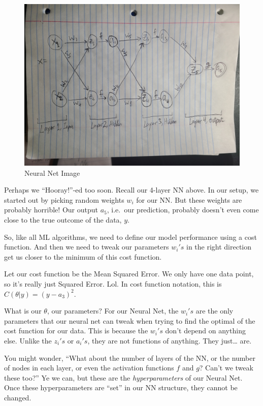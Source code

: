 \documentclass[
]{article}
\begin{document}
\begin{figure}
\centering
\includegraphics{nn_image.jpg}
\caption{Neural Net Image}
\end{figure}

Perhaps we ``Hooray!''-ed too soon. Recall our 4-layer NN above. In our
setup, we started out by picking random weights \(w_i\) for our NN. But
these weights are probably horrible! Our output \(a_5\), i.e.~our
prediction, probably doesn't even come close to the true outcome of the
data, \(y\).

So, like all ML algorithms, we need to define our model performance
using a cost function. And then we need to tweak our parameters
\(w_i's\) in the right direction get us closer to the minimum of this
cost function.

Let our cost function be the Mean Squared Error. We only have one data
point, so it's really just Squared Error. Lol. In cost function
notation, this is \(C(\theta|y) = (y - a_3)^2\).

What is our \(\theta\), our parameters? For our Neural Net, the
\(w_i's\) are the only parameters that our neural net can tweak when
trying to find the optimal of the cost function for our data. This is
because the \(w_i's\) don't depend on anything else. Unlike the
\(z_i's\) or \(a_i's\), they are not functions of anything. They
just\ldots{} are.

You might wonder, ``What about the number of layers of the NN, or the
number of nodes in each layer, or even the activation functions \(f\)
and \(g\)? Can't we tweak these too?'' Ye we can, but these are the
\emph{hyperparameters} of our Neural Net. Once these hyperparameters are
``set'' in our NN structure, they cannot be changed.
\end{document}
